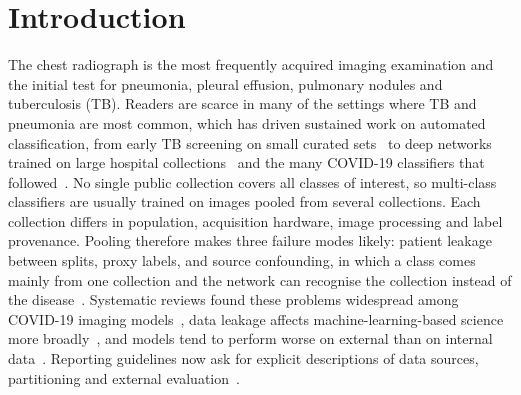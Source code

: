 \section{Introduction}
\label{sec:intro}

The chest radiograph is the most frequently acquired imaging examination and the initial test for pneumonia, pleural effusion, pulmonary nodules and tuberculosis (TB). Readers are scarce in many of the settings where TB and pneumonia are most common, which has driven sustained work on automated classification, from early TB screening on small curated sets~\cite{jaeger2014two,candemir2014lung} to deep networks trained on large hospital collections~\cite{wang2017chestxray8,rajpurkar2017chexnet,irvin2019chexpert,johnson2019mimic} and the many COVID-19 classifiers that followed~\cite{wang2020covidnet,apostolopoulos2020covid,chowdhury2020can}. No single public collection covers all classes of interest, so multi-class classifiers are usually trained on images pooled from several collections. Each collection differs in population, acquisition hardware, image processing and label provenance. Pooling therefore makes three failure modes likely: patient leakage between splits, proxy labels, and source confounding, in which a class comes mainly from one collection and the network can recognise the collection instead of the disease~\cite{zech2018variable,geirhos2020shortcut,degrave2021ai,maguolo2020critic}. Systematic reviews found these problems widespread among COVID-19 imaging models~\cite{wynants2020prediction,roberts2021common}, data leakage affects machine-learning-based science more broadly~\cite{kapoor2023leakage}, and models tend to perform worse on external than on internal data~\cite{yu2022external}. Reporting guidelines now ask for explicit descriptions of data sources, partitioning and external evaluation~\cite{mongan2020claim,collins2024tripodai}.

